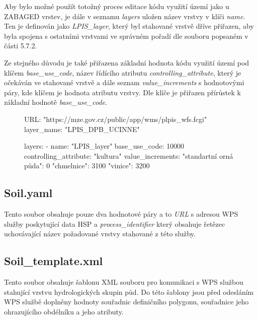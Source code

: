 \documentclass[a4paper,oneside,12pt]{book}
\begin{document}
\hspace{10mm} Aby bylo možné použít totožný proces editace kódu využití území jako u ZABAGED vrstev, je dále v seznamu \textit{layers} uložen název vrstvy v klíči \textit{name}. Ten je definován jako \textit{LPIS\_layer}, který byl stahované vrstvě dříve přiřazen, aby byla spojena s ostatními vrstvami ve správném pořadí dle souboru popsaném v části 5.7.2.

\hspace{10mm}Ze stejného důvodu je také přiřazena základní hodnota kódu využití území pod klíčem \textit{base\_use\_code}, název řídícího atributu \textit{controlling\_attribute}, který je očekáván ve stahované vrstvě a dále seznam \textit{value\_increments} s hodnotovými páry, kde klíčem je hodnota atributu vrstvy. Dle klíče je přiřazen přírůstek k základní hodnotě \textit{base\_use\_code}.

\begin{figure}[H]
\begin{pythoncode}[style=myyaml, caption={Ukázka LPIS.yaml},label={kod:LPIS.yaml}]
URL: "https://mze.gov.cz/public/app/wms/plpis_wfs.fcgi"
layer_name: "LPIS_DPB_UCINNE"

layers:
  - name: "LPIS_layer"
    base_use_code: 10000
    controlling_attribute: "kultura"
    value_increments:
      "standartní orná půda": 0
      "chmelnice": 3100
      "vinice": 3200
\end{pythoncode}
\end{figure}

\subsection*{Soil.yaml} \label{Soil.yaml}
Tento soubor obsahuje pouze dva hodnotové páry a to \textit{URL} s adresou WPS služby poskytující data HSP a \textit{process\_identifier} který obsahuje řetězec uchovávající název požadované vrstvy stahované z této služby.


\subsection*{Soil\_template.xml} \label{Soil_template.xml}
\hspace{10mm} Tento soubor obsahuje šablonu XML souboru pro komunikaci s WPS službou stahující vrstvu hydrologických skupin půd.
Do této šablony jsou před odesláním WPS službě doplněny hodnoty souřadnic definičního polygonu, souřadnice jeho ohrazujícího obdélníku a jeho atributy.
\end{document}
